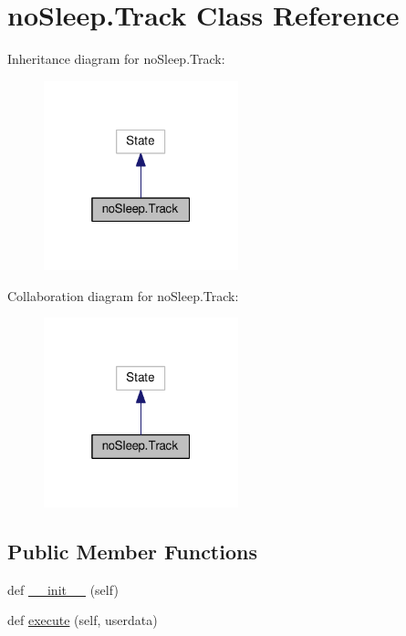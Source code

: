 \hypertarget{classnoSleep_1_1Track}{}\section{no\+Sleep.\+Track Class Reference}
\label{classnoSleep_1_1Track}


Inheritance diagram for no\+Sleep.\+Track\+:\nopagebreak
\begin{figure}[H]
\begin{center}
\leavevmode
\includegraphics[width=160pt]{classnoSleep_1_1Track__inherit__graph}
\end{center}
\end{figure}


Collaboration diagram for no\+Sleep.\+Track\+:\nopagebreak
\begin{figure}[H]
\begin{center}
\leavevmode
\includegraphics[width=160pt]{classnoSleep_1_1Track__coll__graph}
\end{center}
\end{figure}
\subsection*{Public Member Functions}
\begin{DoxyCompactItemize}
\item 
def \hyperlink{classnoSleep_1_1Track_a9af26ff426231cb9c1bc6e5395cf6ec5}{\+\_\+\+\_\+init\+\_\+\+\_\+} (self)
\item 
def \hyperlink{classnoSleep_1_1Track_aa6bbc699fd4253fec111652d41221990}{execute} (self, userdata)
\end{DoxyCompactItemize}

